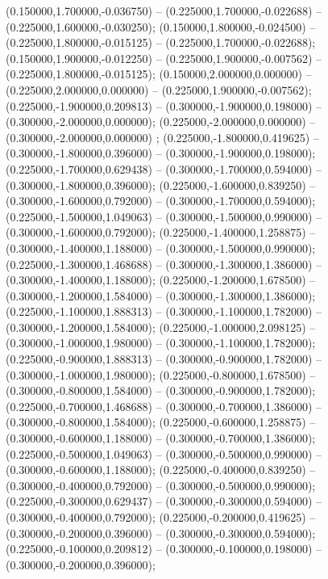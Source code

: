  (0.150000,1.700000,-0.036750) -- (0.225000,1.700000,-0.022688) -- (0.225000,1.600000,-0.030250);
 (0.150000,1.800000,-0.024500) -- (0.225000,1.800000,-0.015125) -- (0.225000,1.700000,-0.022688);
 (0.150000,1.900000,-0.012250) -- (0.225000,1.900000,-0.007562) -- (0.225000,1.800000,-0.015125);
 (0.150000,2.000000,0.000000) -- (0.225000,2.000000,0.000000) -- (0.225000,1.900000,-0.007562);
 (0.225000,-1.900000,0.209813) -- (0.300000,-1.900000,0.198000) -- (0.300000,-2.000000,0.000000);
 (0.225000,-2.000000,0.000000) -- (0.300000,-2.000000,0.000000) ;
 (0.225000,-1.800000,0.419625) -- (0.300000,-1.800000,0.396000) -- (0.300000,-1.900000,0.198000);
 (0.225000,-1.700000,0.629438) -- (0.300000,-1.700000,0.594000) -- (0.300000,-1.800000,0.396000);
 (0.225000,-1.600000,0.839250) -- (0.300000,-1.600000,0.792000) -- (0.300000,-1.700000,0.594000);
 (0.225000,-1.500000,1.049063) -- (0.300000,-1.500000,0.990000) -- (0.300000,-1.600000,0.792000);
 (0.225000,-1.400000,1.258875) -- (0.300000,-1.400000,1.188000) -- (0.300000,-1.500000,0.990000);
 (0.225000,-1.300000,1.468688) -- (0.300000,-1.300000,1.386000) -- (0.300000,-1.400000,1.188000);
 (0.225000,-1.200000,1.678500) -- (0.300000,-1.200000,1.584000) -- (0.300000,-1.300000,1.386000);
 (0.225000,-1.100000,1.888313) -- (0.300000,-1.100000,1.782000) -- (0.300000,-1.200000,1.584000);
 (0.225000,-1.000000,2.098125) -- (0.300000,-1.000000,1.980000) -- (0.300000,-1.100000,1.782000);
 (0.225000,-0.900000,1.888313) -- (0.300000,-0.900000,1.782000) -- (0.300000,-1.000000,1.980000);
 (0.225000,-0.800000,1.678500) -- (0.300000,-0.800000,1.584000) -- (0.300000,-0.900000,1.782000);
 (0.225000,-0.700000,1.468688) -- (0.300000,-0.700000,1.386000) -- (0.300000,-0.800000,1.584000);
 (0.225000,-0.600000,1.258875) -- (0.300000,-0.600000,1.188000) -- (0.300000,-0.700000,1.386000);
 (0.225000,-0.500000,1.049063) -- (0.300000,-0.500000,0.990000) -- (0.300000,-0.600000,1.188000);
 (0.225000,-0.400000,0.839250) -- (0.300000,-0.400000,0.792000) -- (0.300000,-0.500000,0.990000);
 (0.225000,-0.300000,0.629437) -- (0.300000,-0.300000,0.594000) -- (0.300000,-0.400000,0.792000);
 (0.225000,-0.200000,0.419625) -- (0.300000,-0.200000,0.396000) -- (0.300000,-0.300000,0.594000);
 (0.225000,-0.100000,0.209812) -- (0.300000,-0.100000,0.198000) -- (0.300000,-0.200000,0.396000);
